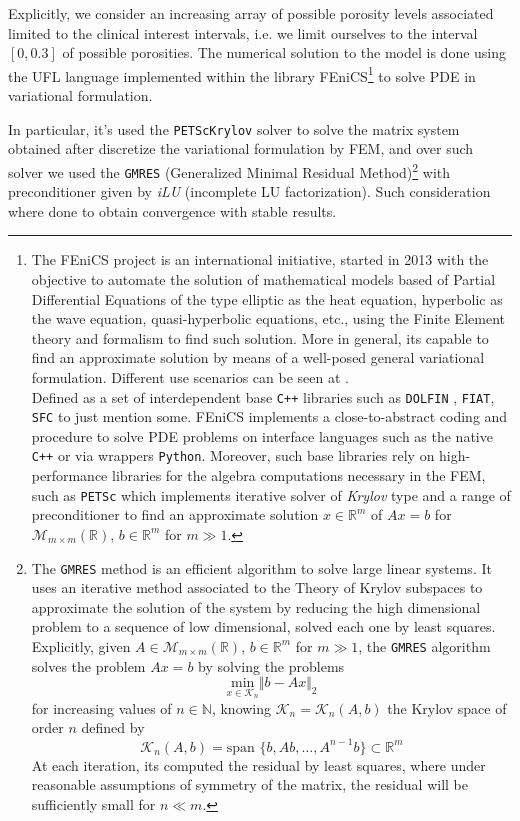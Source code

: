 Explicitly, we consider an increasing array of possible porosity levels associated limited to the clinical interest intervals, i.e. we limit ourselves to the interval $[0, 0.3]$ of possible porosities. The numerical solution to the model is done using the UFL language implemented within the library FEniCS\footnote{The FEniCS project \cite{logg2012automated} is an international initiative, started in 2013 with the objective to automate the solution of mathematical models based of Partial Differential Equations of the type elliptic as the heat equation, hyperbolic as the wave equation, quasi-hyperbolic equations, etc., using the Finite Element theory and formalism to find such solution. More in general, its capable to find an approximate solution by means of a well-posed general variational formulation. Different use scenarios can be seen at \cite{abali2016computational}.\\
Defined as a set of interdependent base \texttt{C++} libraries such as \texttt{DOLFIN} \cite{LoggWells2010a}, \texttt{FIAT}, \texttt{SFC} to just mention some. FEniCS implements a close-to-abstract coding and procedure to solve PDE problems on interface languages such as the native \texttt{C++} or via wrappers \texttt{Python}. Moreover, such base libraries rely on high-performance libraries for the algebra computations necessary in the FEM, such as \texttt{PETSc} which implements iterative solver of \textit{Krylov} type and a range of preconditioner to find an approximate solution $x \in \mathbb{R}^m$ of $Ax = b$ for $\mathcal{M}_{m \times m}(\mathbb{R})$, $b \in \mathbb{R}^m$ for $m \gg 1$.} to solve PDE in variational formulation.

In particular, it's used the \texttt{PETScKrylov} solver to solve the matrix system obtained after discretize the variational formulation by FEM, and over such solver we used the \texttt{GMRES} (Generalized Minimal Residual Method)\footnote{The \texttt{GMRES} method is an efficient algorithm to solve large linear systems. It uses an iterative method associated to the Theory of Krylov subspaces to approximate the solution of the system by reducing the high dimensional problem to a sequence of low dimensional, solved each one by least squares.
Explicitly, given $A \in \mathcal{M}_{m\times m} (\mathbb{R})$, $b \in \mathbb{R}^m$ for $m\gg 1$, the \texttt{GMRES} algorithm solves the problem $A x = b$ by solving the problems 
\begin{equation*}
    \underset{x \in \mathcal{K}_n}{\text{ min }} \Vert b - Ax \Vert_2   
\end{equation*} 
for increasing values of $n \in \mathbb{N}$, knowing $\mathcal{K}_n = \mathcal{K}_n(A,b)$ the Krylov space of order $n$ defined by
\begin{equation*}
 \mathcal{K}_n(A,b) = \text{span }\{ b, Ab, \dots, A^{n-1}b \} \subset \mathbb{R}^m   
\end{equation*}
At each iteration, its computed the residual by least squares, where under reasonable assumptions of symmetry of the matrix, the residual will be sufficiently small for $n \ll m$.} with preconditioner given by \textit{iLU} (incomplete LU factorization). Such consideration where done to obtain convergence with stable results.

